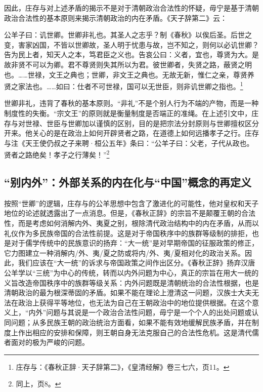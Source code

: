 \documentclass[a4paper, 12pt, openright]{ctexbook}
\renewenvironment{quote}
  {\list{}{\rightmargin2\ccwd \leftmargin2\ccwd \itemindent=2\ccwd \listparindent=2\ccwd}%
   \item\relax\small\kaishu\color{black}}
  {\endlist}
\begin{document}
因此，庄存与对上述矛盾的揭示不是对于清朝政治合法性的怀疑，毋宁是基于清朝政治合法性的基本原则来揭示清朝政治的内在矛盾。《天子辞第二》云：

\begin{quote}
公羊子曰：讥世卿。世卿非礼也。其圣人之志乎？制《春秋》以俟后圣。后世之变，害家凶国，不皆以世卿故，圣人明于忧患与故，岂不知之，则何以必讥世卿？告为民上者，知天人之本，笃君臣之义也。告哀公曰：义者，宜也，尊贤为大。是故非贤不可以为卿。君不尊贤则失其所以为君。彼世卿者，失贤之路，蔽贤之明也。……世禄，文王之典也；世卿，非文王之典也。无故无新，惟仁之亲，尊贤养贤之家法也。……如曰：仕者不可世禄，国可以无世臣，则非讥世卿之指也。\footnote{庄存与：《春秋正辞·天子辞第二》，《皇清经解》卷三七六，页11。}
\end{quote}

世卿非礼，违背了春秋的基本原则。“非礼”不是个别人行为不端的产物，而是一种制度性的失衡。“宗文王”的原则就是衡量制度是否端正的准绳。在上述引文中，庄存与对世禄、世臣与世卿加以谨慎的区别，目的是把宗法分封原则与世卿擅权区分开来。他关心的是在政治上如何开辟贤者之路，在道德上如何远播孝子之行。庄存与注《天王使仍叔之子来聘·桓公五年》条曰：“公羊子曰：父老，子代从政也。贤者之路绝矣！孝子之行薄矣！”\footnote{同上，页8。}

\subsection{“别内外”：外部关系的内在化与“中国”概念的再定义}

按照“世卿”的逻辑，庄存与的公羊思想中包含了激进化的可能性，他对皇权和天子地位的论述就透露出了一点消息。但是，《春秋正辞》的宗旨不是颠覆王朝的合法性，而是考虑如何消解内外、夷夏之别，根除清代政治结构中的内在矛盾，从而以礼仪作为多民族帝国的合法性前提。这是对于帝国秩序中的族群等级制的排拒，也是对于儒学传统中的民族意识的扬弃：“大一统”是对早期帝国的征服政策的修正，它力图建立一种消解内/外、夷/夏之防或将内/外、夷/夏相对化的政治关系。因此，我们应该在“大一统”的诉求与帝国政策之间作出区分。《春秋正辞》扬弃汉唐公羊学以“三统”为中心的传统，转而以内外问题为中心，真正的宗旨在用大一统的义旨改造帝国秩序中的族群等级关系：内外问题既是清朝统治的合法性根据，也是清朝政治的最为根深蒂固的矛盾。如果不能在理论上澄清这一问题，汉族士大夫无法在政治上获得平等地位，也无法为自己在王朝政治中的地位提供根据。在这个意义上，“内外”问题与其说是一个政治合法性问题，毋宁是一个个人的出处问题或认同问题；从多民族王朝的政治统治方面看，如果不能有效地缓解民族矛盾，并在制度上作出相应的安排和保障，则王朝自身无法克服自己的合法性危机。这是清代儒者面对的极为严峻的问题。
\end{document}
